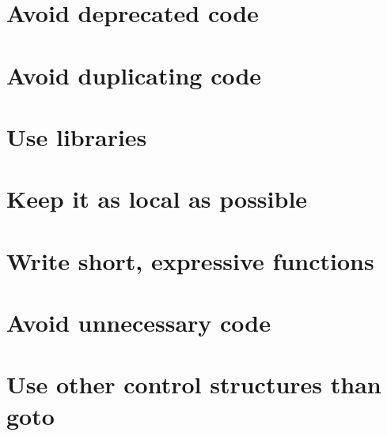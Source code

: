 \documentclass[a4paper,10pt]{scrreprt}
\begin{document}
\section{Avoid deprecated code}
\section{Avoid duplicating code}
\section{Use libraries}
\section{Keep it as local as possible}
\section{Write short, expressive functions}
\section{Avoid unnecessary code}
\section{Use other control structures than goto}
\end{document}

